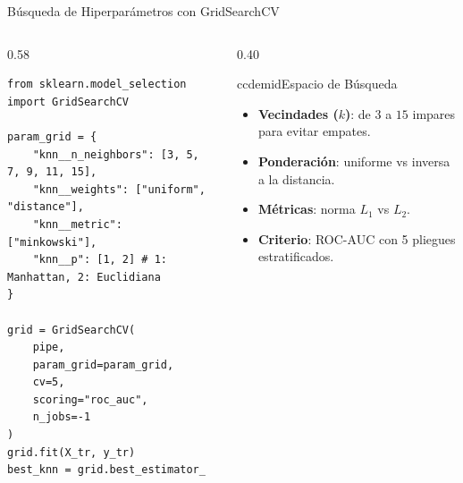 \begin{frame}[fragile]{Búsqueda de Hiperparámetros con GridSearchCV}
\begin{columns}[T,onlytextwidth]
\begin{column}{0.58\textwidth}
\begin{lstlisting}[style=ccdepython]
from sklearn.model_selection import GridSearchCV

param_grid = {
    "knn__n_neighbors": [3, 5, 7, 9, 11, 15],
    "knn__weights": ["uniform", "distance"],
    "knn__metric": ["minkowski"],
    "knn__p": [1, 2] # 1: Manhattan, 2: Euclidiana
}

grid = GridSearchCV(
    pipe,
    param_grid=param_grid,
    cv=5,
    scoring="roc_auc",
    n_jobs=-1
)
grid.fit(X_tr, y_tr)
best_knn = grid.best_estimator_
\end{lstlisting}
\end{column}

\begin{column}{0.40\textwidth}
\begin{contrastbox}{ccdemid}{Espacio de Búsqueda}
\footnotesize
\begin{itemize}\setlength{\itemsep}{0.15em}
  \item \textbf{Vecindades ($k$)}: de $3$ a $15$ impares para evitar empates.
  \item \textbf{Ponderación}: uniforme vs inversa a la distancia.
  \item \textbf{Métricas}: norma $L_1$ vs $L_2$.
  \item \textbf{Criterio}: ROC-AUC con 5 pliegues estratificados.
\end{itemize}
\end{contrastbox}
\end{column}
\end{columns}
\end{frame}


